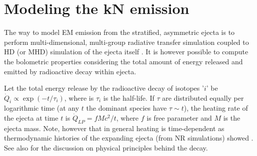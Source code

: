 \section{Modeling the \ac{kN} emission}

The way to model \ac{EM} emission from the stratified, asymmetric ejecta is to perform 
multi-dimensional, multi-group radiative transfer simulation coupled to \ac{HD} (or \ac{MHD}) 
simulation of the ejecta itself \cite[\eg][]{Bulla:2019muo}.
%
It is however possible to compute the bolometric properties considering the total amount 
of energy released and emitted by radioactive decay within ejecta. 

%
%




Let the total energy release by the radioactive decay of isotopes '$i$' be 
$\dot{Q}_i \propto \exp(-t/\tau_i)$, where is $\tau_i$ is the half-life. If $\tau$ 
are distributed equally per logarithmic time (at any $t$ the dominant species have $\tau\sim t$), 
the heating rate of the ejecta at time $t$ is
%
$\dot{Q}_{LP} = f M c^2 / t$,
%
where $f$ is free parameter and $M$ is the ejecta mass.
%
Note, however that in general heating is time-dependent as thermodynamic histories of the expanding 
ejecta (from \ac{NR} simulations) showed \citep{Metzger:2010,Roberts:2011,Korobkin:2012uy}.
See also \citet{Hotokezaka:2017dbk} for the discussion on physical principles behind the decay.
%

